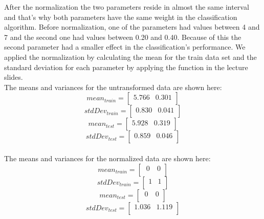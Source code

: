 \documentclass{article}      %
\begin{document}
After the normalization the two parameters reside in almost the same interval and that's why both parameters have the same weight in the classification algorithm. Before normalization, one of the parameters had values between 4 and 7 and the second one had values between 0.20 and 0.40. Because of this the second parameter had a smaller effect in the classification's performance. We applied the normalization by calculating the mean for the train data set and the standard deviation for each parameter by applying the function in the lecture slides. \\

The means and variances for the untransformed data are shown here:\\

\[
mean_{train} 
=
\begin{bmatrix}
    5.766       & 0.301  \\
\end{bmatrix}
\]
\[
stdDev_{train}
=
\begin{bmatrix}
    0.830       & 0.041  \\
\end{bmatrix}
\]
\[
mean_{test} 
=
\begin{bmatrix}
    5.928       & 0.319  \\
\end{bmatrix}
\]
\[
stdDev_{test}
=
\begin{bmatrix}
    0.859       & 0.046  \\
\end{bmatrix}
\]\\

The means and variances for the normalized data are shown here:\\

\[
mean_{train} 
=
\begin{bmatrix}
    ~0      & ~0  \\
\end{bmatrix}
\]
\[
stdDev_{train}
=
\begin{bmatrix}
    1       & 1  \\
\end{bmatrix}
\]
\[
mean_{test} 
=
\begin{bmatrix}
    ~0       & ~0  \\
\end{bmatrix}
\]
\[
stdDev_{test}
=
\begin{bmatrix}
    1.036       & 1.119  \\
\end{bmatrix}
\]\\
 
\end{document}
